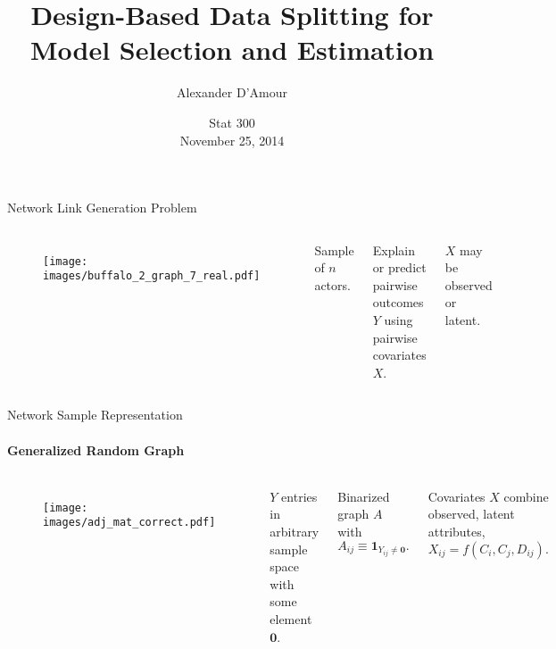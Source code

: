 \documentclass{beamer}
\title[Design for Data Splitting]{Design-Based Data Splitting for Model Selection and Estimation}
\institute[Harvard Statistics]{Harvard University\\ Department of Statistics}
\author[D'Amour/Airoldi]{Alexander D'Amour}
\date[Stat 300 11/25/2014]{Stat 300\\ November 25, 2014}
\begin{document}
\begin{frame}[plain]
  \titlepage
 \end{frame}

 \begin{frame}{Network Link Generation Problem}
 \begin{columns}
 \begin{figure}
 \centering
 \texttt{[image: images/buffalo\_2\_graph\_7\_real.pdf]}
 \end{figure}

 Sample of $n$ actors. 
 \newline

 Explain or predict pairwise outcomes $Y$ using pairwise covariates $X$.
 \newline

 $X$ may be observed or latent.
 \end{columns}
\end{frame}


\begin{frame}{Network Sample Representation}
    \framesubtitle{Generalized Random Graph}
 
     \begin{columns}
    \begin{figure}
        \centering
     \texttt{[image: images/adj\_mat\_correct.pdf]}
     \end{figure}

         $Y$ entries in \alert{arbitrary sample space}
         with some element $\bm 0$.
         \newline

         Binarized graph $A$ with $$A_{ij} \equiv \bm{1}_{Y_{ij} \neq \bm 0}.$$

         Covariates $X$ combine observed, latent attributes,$$X_{ij} = f(C_i, C_j, D_{ij}).$$
     \end{columns}
 \end{frame}
\end{document}
